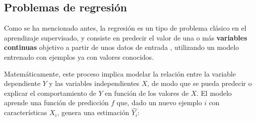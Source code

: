 
    







\subsection{Problemas de regresión}

Como se ha mencionado antes, la regresión es un tipo de problema clásico en el aprendizaje supervisado, y 
consiste en predecir el valor de una o más \textbf{variables continuas} objetivo a partir de unos datos de 
entrada \cite{bishop2006}, utilizando un modelo entrenado con ejemplos ya con valores conocidos.

Matemáticamente, este proceso implica modelar la relación entre la variable dependiente $Y$ y las variables
independientes $X$, de modo que se pueda predecir o explicar el comportamiento de $Y$ en función de los 
valores de $X$. El modelo aprende una función de predicción $f$ que, dado un nuevo ejemplo $i$ con 
características $X_i$, genera una estimación $\hat{Y_i}$:

